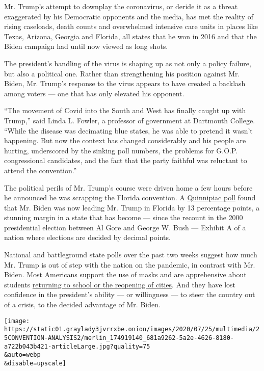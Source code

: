 Mr. Trump's attempt to downplay the coronavirus, or deride it as a
threat exaggerated by his Democratic opponents and the media, has met
the reality of rising caseloads, death counts and overwhelmed intensive
care units in places like Texas, Arizona, Georgia and Florida, all
states that he won in 2016 and that the Biden campaign had until now
viewed as long shots.

The president's handling of the virus is shaping up as not only a policy
failure, but also a political one. Rather than strengthening his
position against Mr. Biden, Mr. Trump's response to the virus appears to
have created a backlash among voters --- one that has only elevated his
opponent.

``The movement of Covid into the South and West has finally caught up
with Trump,'' said Linda L. Fowler, a professor of government at
Dartmouth College. ``While the disease was decimating blue states, he
was able to pretend it wasn't happening. But now the context has changed
considerably and his people are hurting, underscored by the sinking poll
numbers, the problems for G.O.P. congressional candidates, and the fact
that the party faithful was reluctant to attend the convention.''

The political perils of Mr. Trump's course were driven home a few hours
before he announced he was scrapping the Florida convention. A
\href{https://poll.qu.edu/national/release-detail?ReleaseID=3668}{Quinnipiac
poll} found that Mr. Biden was now leading Mr. Trump in Florida by 13
percentage points, a stunning margin in a state that has become ---
since the recount in the 2000 presidential election between Al Gore and
George W. Bush --- Exhibit A of a nation where elections are decided by
decimal points.

National and battleground state polls over the past two weeks suggest
how much Mr. Trump is out of step with the nation on the pandemic, in
contrast with Mr. Biden. Most Americans support the use of masks and are
apprehensive about students
\href{https://www.nytimes3xbfgragh.onion/2020/07/24/us/politics/trump-schools.html}{returning
to school or the reopening of cities}. And they have lost confidence in
the president's ability --- or willingness --- to steer the country out
of a crisis, to the decided advantage of Mr. Biden.

\texttt{[image: https://static01.graylady3jvrrxbe.onion/images/2020/07/25/multimedia/25CONVENTION-ANALYSIS2/merlin\_174919140\_681a9262-5a2e-4626-8180-a722b043b421-articleLarge.jpg?quality=75\\\&auto=webp\\\&disable=upscale]}

